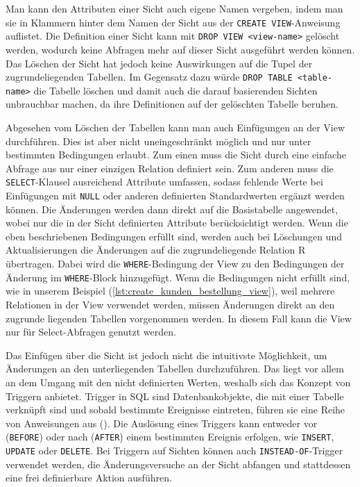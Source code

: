 

Man kann den Attributen einer Sicht auch eigene Namen vergeben, indem man sie in Klammern hinter dem Namen der Sicht aus der \texttt{CREATE VIEW}-Anweisung auflistet.
Die Definition einer Sicht kann mit \texttt{DROP VIEW <view-name>} gelöscht werden, wodurch keine Abfragen mehr auf dieser Sicht ausgeführt werden können.
Das Löschen der Sicht hat jedoch keine Auswirkungen auf die Tupel der zugrundeliegenden Tabellen.
Im Gegensatz dazu würde \texttt{DROP TABLE <table-name>} die Tabelle löschen und damit auch die darauf basierenden Sichten unbrauchbar machen, da ihre Definitionen auf der gelöschten Tabelle beruhen.

Abgesehen vom Löschen der Tabellen kann man auch Einfügungen an der View durchführen.
Dies ist aber nicht uneingeschränkt möglich und nur unter bestimmten Bedingungen erlaubt.
Zum einen muss die Sicht durch eine einfache Abfrage aus nur einer einzigen Relation definiert sein.
Zum anderen muss die \texttt{SELECT}-Klausel ausreichend Attribute umfassen, sodass fehlende Werte bei Einfügungen mit \texttt{NULL} oder anderen definierten Standardwerten ergänzt werden können.
Die Änderungen werden dann direkt auf die Basistabelle angewendet, wobei nur die in der Sicht definierten Attribute berücksichtigt werden.
Wenn die eben beschriebenen Bedingungen erfüllt sind, werden auch bei Löschungen und Aktualisierungen die Änderungen auf die zugrundeliegende Relation R übertragen.
Dabei wird die \texttt{WHERE}-Bedingung der View zu den Bedingungen der Änderung im \texttt{WHERE}-Block hinzugefügt.
Wenn die Bedingungen nicht erfüllt sind, wie in unserem Beispiel (\ref{lst:create_kunden_bestellung_view}), weil mehrere Relationen in der View verwendet werden, müssen Änderungen direkt an den zugrunde liegenden Tabellen vorgenommen werden.
In diesem Fall kann die View nur für Select-Abfragen genutzt werden.

Das Einfügen über die Sicht ist jedoch nicht die intuitivste Möglichkeit, um Änderungen an den unterliegenden Tabellen durchzuführen.
Das liegt vor allem an dem Umgang mit den nicht definierten Werten, weshalb sich das Konzept von Triggern anbietet.
Trigger in SQL sind Datenbankobjekte, die mit einer Tabelle verknüpft sind und sobald bestimmte Ereignisse eintreten, führen sie eine Reihe von Anweisungen aus (\cite{trigger_erklaerung}).
Die Auslösung eines Triggers kann entweder vor (\texttt{BEFORE}) oder nach (\texttt{AFTER}) einem bestimmten Ereignis erfolgen, wie \texttt{INSERT}, \texttt{UPDATE} oder \texttt{DELETE}.
Bei Triggern auf Sichten können auch \texttt{INSTEAD-OF}-Trigger verwendet werden, die Änderungsversuche an der Sicht abfangen und stattdessen eine frei definierbare Aktion ausführen.

